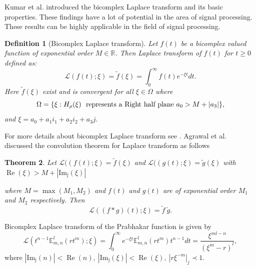 \documentclass[a4paper,12pt]{article}
\newtheorem{theorem}{Theorem}[section]
\newtheorem{definition}[theorem]{Definition}
\theoremstyle{remark}
\begin{document}
Kumar et al. \cite{akumar2011a} introduced the bicomplex Laplace transform and its basic properties. These findings have a lot of potential in the area of signal processing.
These results can be highly applicable in the field of signal processing.\\
\begin{definition}[Bicomplex	  Laplace transform]
	Let $f(t)$ be a bicomplex valued function of exponential order $M\in \mathbb{R}$. Then Laplace
	transform of $f(t)$ for $t \ge 0$  defined as:
	\begin{equation}\label{eq:bc lap def}
	\mathcal{L}(f(t);\xi) =\tilde{f}(\xi)= \int_{0}^{\infty}f(t)e^{-\xi t}dt.
	\end{equation}
	Here $\tilde{f}(\xi)$ exist and is convergent for all $\xi \in  \Omega$
	where
		\begin{equation}\label{eq:lap domain}\notag
	\Omega= \{\xi:H_\rho(\xi)~\text{ represents a Right half plane}~ a_0>	M+|a_3|  \},
	\end{equation}	
   and  $\xi  = a_0 + a_1i_1 + a_2i_2 + a_3j.$\\
 \end{definition}  
\noindent   For more details about bicomplex Laplace transform see \cite{akumar2011a,ragarwal2014a}.  
Agrawal et al. \cite{ragarwal2014a} discussed the convolution theorem for Laplace transform as follows
\begin{theorem}
    

Let $\mathcal{L}((f(t);\xi)=\tilde{f}(\xi)$ and $\mathcal{L}((g(t);\xi)= \tilde{g}(\xi)$ with %
$ 
\operatorname{Re}(\xi )>M +|\operatorname{Im_j}(\xi)| $ %

where $M=\max(M_1,M_2) $ and $f(t)$ and $g(t)$ are  of exponential order $M_1$ and $M_2$ respectively. Then  
\[
\mathcal{L}( (f * g)(t);\xi)  = \tilde{f}~\tilde{g}.
\]
\end{theorem}
Bicomplex
Laplace transform of the Prabhakar function	is given by \cite{ragarwal2025}
\begin{equation}\label{eq:bclt 3para}
\mathcal{L}(t^{n-1}\mathbb{E}_{ m,n}^l(r t^{ m});\xi)=\int_{0}^{\infty}e^{-\xi t}\mathbb{E}_{ m, n}^l(r t^{ m})t^{n-1}dt=\frac{\xi^{ ml-n}}{(\xi^{ m}-r)^l},
\end{equation}\label{eq:plap}
where	
$|\operatorname{Im_j}(n)|<\operatorname{Re}(n),~|\operatorname{Im_j}(\xi)|<\operatorname{Re}(\xi),~|r\xi^{- m}|_j\prec1.$\\
	
\end{document}
